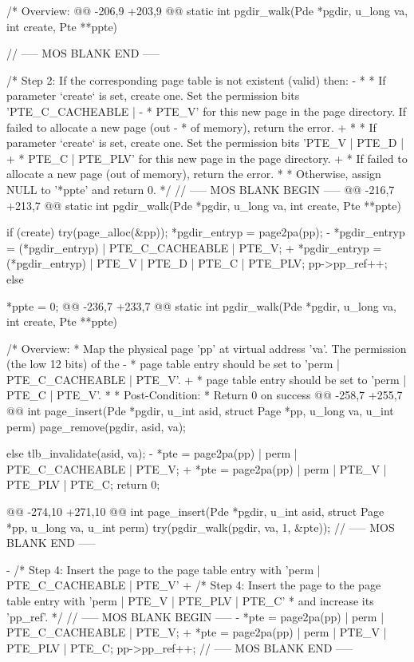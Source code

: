 \begin{CodeBlock}[language=BookDiff]
{{{ /* Overview:
@@ -206,9 +203,9 @@ static int pgdir_walk(Pde *pgdir, u_long va, int create, Pte **ppte) {
    // ----- MOS BLANK END -----
 
    /* Step 2: If the corresponding page table is not existent (valid) then:
-    *   * If parameter `create` is set, create one. Set the permission bits 'PTE_C_CACHEABLE |
-    *     PTE_V' for this new page in the page directory. If failed to allocate a new page (out
-    *     of memory), return the error.
+    *   * If parameter `create` is set, create one. Set the permission bits 'PTE_V | PTE_D |
+    *      PTE_C | PTE_PLV' for this new page in the page directory.
+    *      If failed to allocate a new page (out of memory), return the error.
     *   * Otherwise, assign NULL to '*ppte' and return 0.
     */
    // ----- MOS BLANK BEGIN -----
@@ -216,7 +213,7 @@ static int pgdir_walk(Pde *pgdir, u_long va, int create, Pte **ppte) {
        if (create) {
            try(page_alloc(&pp));
            *pgdir_entryp = page2pa(pp);
-           *pgdir_entryp = (*pgdir_entryp) | PTE_C_CACHEABLE | PTE_V;
+           *pgdir_entryp = (*pgdir_entryp) | PTE_V | PTE_D | PTE_C | PTE_PLV;
            pp->pp_ref++;
        } else {
            *ppte = 0;
@@ -236,7 +233,7 @@ static int pgdir_walk(Pde *pgdir, u_long va, int create, Pte **ppte) {
 
 /* Overview:
  *   Map the physical page 'pp' at virtual address 'va'. The permission (the low 12 bits) of the
- *   page table entry should be set to 'perm | PTE_C_CACHEABLE | PTE_V'.
+ *   page table entry should be set to 'perm | PTE_C | PTE_V'.
  *
  * Post-Condition:
  *   Return 0 on success
@@ -258,7 +255,7 @@ int page_insert(Pde *pgdir, u_int asid, struct Page *pp, u_long va, u_int perm)
            page_remove(pgdir, asid, va);
        } else {
            tlb_invalidate(asid, va);
-           *pte = page2pa(pp) | perm | PTE_C_CACHEABLE | PTE_V;
+           *pte = page2pa(pp) | perm | PTE_V | PTE_PLV | PTE_C;
            return 0;
        }
    }
@@ -274,10 +271,10 @@ int page_insert(Pde *pgdir, u_int asid, struct Page *pp, u_long va, u_int perm)
    try(pgdir_walk(pgdir, va, 1, &pte));
    // ----- MOS BLANK END -----
 
-   /* Step 4: Insert the page to the page table entry with 'perm | PTE_C_CACHEABLE | PTE_V'
+   /* Step 4: Insert the page to the page table entry with 'perm | PTE_V | PTE_PLV | PTE_C'
     * and increase its 'pp_ref'. */
    // ----- MOS BLANK BEGIN -----
-   *pte = page2pa(pp) | perm | PTE_C_CACHEABLE | PTE_V;
+   *pte = page2pa(pp) | perm | PTE_V | PTE_PLV | PTE_C;
    pp->pp_ref++;
    // ----- MOS BLANK END -----
 
}}}}}
\end{CodeBlock}
